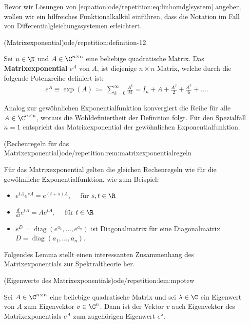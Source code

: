 \documentclass[letterpaper,10pt,english]{jupyterBook}
\begin{document}
\par
Bevor wir Lösungen von \eqref{equation:ode/repetition:eq:linhomdglsystem} angeben, wollen wir ein hilfreiches Funktionalkalkül einführen, dass die Notation im Fall von Differentialgleichungssystemen erleichtert.
\begin{definition}{(Matrixexponential)}{ode/repetition:definition-12}



\par
Sei \(n \in \N\) und \(A \in \C^{n \times n}\) eine beliebige quadratische Matrix.
Das \textbf{Matrixexponential} \(e^A\) von \(A\), ist diejenige \(n\times n\) Matrix, welche durch die folgende Potenzreihe definiert ist:
\begin{align*}
e^A \equiv \exp(A) \ \coloneqq \ \sum_{k=0}^\infty \frac{A^k}{k!} = I_n + A + \frac{A^2}{2} + \frac{A^3}{6} + \ldots.
\end{align*}
\par
Analog zur gewöhnlichen Exponentialfunktion konvergiert die Reihe für alle \(A \in \C^{n \times n}\), woraus die Wohldefiniertheit der Definition folgt.
Für den Spezialfall \(n=1\) entspricht das Matrixexponential der gewöhnlichen Exponentialfunktion.
\end{definition}
\begin{remark}{(Rechenregeln für das Matrixexponential)}{ode/repetition:rem:matrixexponentialregeln}



\par
Für das Matrixexponential gelten die gleichen Rechenregeln wie für die gewöhnliche Exponentialfunktion, wie zum Beispiel:
\begin{itemize}
\item {} 
\par
\(e^{tA}e^{sA} = e^{(t+s)A}, \quad\) für \(s,t \in \R\)

\item {} 
\par
\(\frac{d}{dt} e^{tA} = Ae^{tA}, \quad\) für \(t \in \R\)

\item {} 
\par
\( e^{D} = \operatorname{diag}(e^{a_1}, \ldots, e^{a_n})\) ist Diagonalmatrix für eine Diagonalmatrix \(D = \operatorname{diag}(a_1, \ldots, a_n)\).

\end{itemize}
\end{remark}

\par
Folgendes Lemma stellt einen interessanten Zusammenhang des Matrixexponentials zur Spektraltheorie her.
\begin{lemma}{(Eigenwerte des Matrixexponentials)}{ode/repetition:lem:mpotew}



\par
Sei \(A \in \C^{n\times n}\) eine beliebige quadratische Matrix und sei \(\lambda \in \C\) ein Eigenwert von \(A\) zum
Eigenvektor \(v \in \C^n\).
Dann ist der Vektor \(v\) auch Eigenvektor des Matrixexponentials \(e^A\) zum zugehörigen Eigenwert \(e^\lambda\).
\end{lemma}
\end{document}
